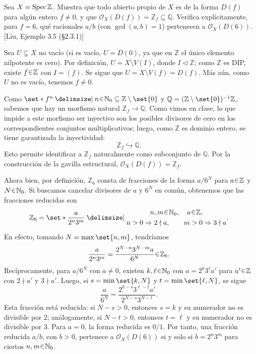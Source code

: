 \begin{ejer}\label{ejer:t3-espectro-enteros}
Sea $X=\operatorname{Spec}\mathbb Z$. Muestra que todo abierto propio de $X$ es de la forma $D(f)$ para algún entero $f\ne0$, y que $\mathcal O_X(D(f))=\mathbb Z_f\subseteq\mathbb Q$. Verifica explícitamente, para $f=6$, qué racionales $a/b$ (con $\gcd(a,b)=1$) pertenecen a $\mathcal O_X(D(6))$. \hfill [Liu, Ejemplo 3.5 (§2.3.1)]
\end{ejer}
\begin{sol}
Sea $U\subsetneq X$ no vacío (si es vacío, $U=D(0)$, ya que en $\mathbb Z$ el único elemento nilpotente es cero). Por definición, $U=X\setminus V(I)$, donde $I\triangleleft\mathbb Z$; como $\mathbb Z$ es DIP, existe $f\en\mathbb Z$ con $I=(f)$. Se sigue que $U=X\setminus V(f)=D(f)$. Más aún, como $U$ no es vacío, tenemos $f\ne0$.

Como $\set*{f^n\given n\en\mathbb N_0}\subseteq\mathbb Z\setminus\set{0}$ y $\mathbb Q=(\mathbb Z\setminus\set{0})^{-1}\mathbb Z$, sabemos que hay un morfismo natural $\mathbb Z_f\to\mathbb Q$. Como vimos en clase, lo que impide a este morfismo ser inyectivo son los posibles divisores de cero en los correspondientes conjuntos multiplicativos; luego, como $\mathbb Z$ es dominio entero, se tiene garantizada la inyectividad:
\[
\mathbb Z_f\hookrightarrow\mathbb Q.
\]
Esto permite identificar a $\mathbb Z_f$ naturalmente como subconjunto de $\mathbb Q$. Por la construcción de la gavilla estructural, $\mathcal O_X(D(f))=\mathbb Z_f$.

Ahora bien, por definición, $\mathbb Z_6$ consta de fracciones de la forma $a/6^N$ para $a\en\mathbb Z$ y $N\en\mathbb N_0$. Si buscamos cancelar divisores de $a$ y $6^N$ en común, obtenemos que las fracciones reducidas son
\[
\mathbb Z_6=
\set*{\frac{a}{2^n3^m}\given
\begin{gathered}
n,m\en\mathbb N_0,\quad a\en\mathbb Z,\\
n>0\Rightarrow2\nmid a,\qquad m>0\Rightarrow3\nmid a
\end{gathered}}.
\]
En efecto, tomando $N=\max\set{n,m}$, tendríamos
\[
\frac{a}{2^n3^m}=\frac{2^{N-n}3^{N-m}a}{6^N}\en\mathbb Z_6.
\]
Recíprocamente, para $a/6^N$ con $a\ne0$, existen $k,\ell\en\mathbb N_0$ con $a=2^k3^\ell a'$ para $a'\en\mathbb Z$ con $2\nmid a'$ y $3\nmid a'$. Luego, si $s=\min\set{k,N}$ y $t=\min\set{\ell,N}$, se sigue
\[
\frac{a}{6^N}=\frac{2^{k-s}3^{\ell-t}a'}{2^{N-s}3^{N-t}}.
\]
Esta fracción está reducida: si $N-s>0$, entonces $s=k$ y su numerador no es divisible por $2$; análogamente, si $N-t>0$, entonces $t=\ell$ y su numerador no es divisible por $3$. Para $a=0$, la forma reducida es $0/1$. Por tanto, una fracción reducida $a/b$, con $b>0$, pertenece a $\mathcal O_X(D(6))$ si y solo si $b=2^n3^m$ para ciertos $n,m\en\mathbb N_0$.
\end{sol}
